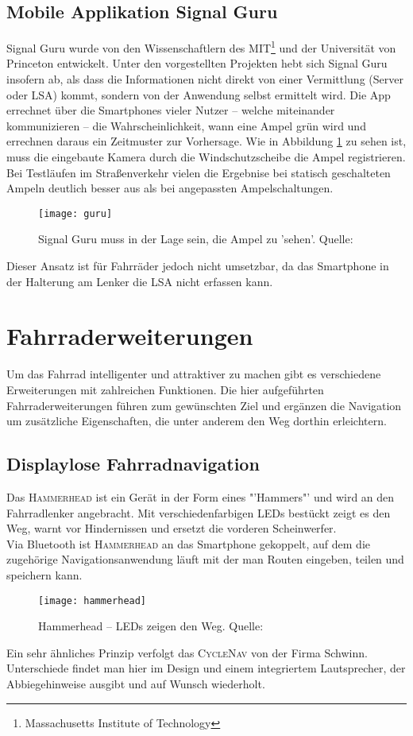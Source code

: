 \subsection*{Mobile Applikation Signal Guru}
Signal Guru wurde von den Wissenschaftlern des MIT\footnote{ Massachusetts Institute of Technology} und der Universität von Princeton entwickelt. Unter den vorgestellten Projekten hebt sich Signal Guru insofern ab, als dass die Informationen nicht direkt von einer Vermittlung (Server oder \gls{LSA}) kommt, sondern von der Anwendung selbst ermittelt wird. Die \Gls{App} errechnet über die \glspl{Smartphone} vieler Nutzer -- welche miteinander kommunizieren -- die Wahrscheinlichkeit, wann eine Ampel grün wird und errechnen daraus ein Zeitmuster zur Vorhersage. Wie in Abbildung \ref{fig:AppSignalGuru} zu sehen ist, muss die eingebaute Kamera durch die Windschutzscheibe die Ampel registrieren. Bei Testläufen im Straßenverkehr vielen die Ergebnise bei statisch geschalteten Ampeln deutlich besser aus als bei angepassten Ampelschaltungen. \cite{SignalGuruPaper}\\ 
\begin{figure}[H]
    \centering
    \texttt{[image: guru]}
    \grayRule
    \caption[Signal Guru]{Signal Guru muss in der Lage sein, die Ampel zu 'sehen'.  Quelle: \cite{SignalGuruPaper}} \label{fig:AppSignalGuru}
\end{figure}
Dieser Ansatz ist für Fahrräder jedoch nicht umsetzbar, da das \gls{Smartphone} in der Halterung am Lenker die \gls{LSA} nicht erfassen kann.
%
%
\clearpage
\section{Fahrraderweiterungen}
Um das Fahrrad intelligenter und attraktiver zu machen gibt es verschiedene Erweiterungen mit zahlreichen Funktionen. Die hier aufgeführten Fahrraderweiterungen führen zum gewünschten Ziel und ergänzen die Navigation um zusätzliche Eigenschaften, die unter anderem den Weg dorthin erleichtern.
\subsection{Displaylose Fahrradnavigation}
Das \textsc{Hammerhead} ist ein Gerät in der Form eines "'Hammers"' und wird an den Fahrradlenker angebracht. Mit verschiedenfarbigen \glspl{LED} bestückt zeigt es den Weg, warnt vor Hindernissen und ersetzt die vorderen Scheinwerfer.\\
Via Bluetooth ist \textsc{Hammerhead} an das \gls{Smartphone} gekoppelt, auf dem die zugehörige Navigationsanwendung läuft mit der man Routen eingeben, teilen und speichern kann. \cite{Hammerhead}\\
\begin{figure}[H]
    \centering
    \texttt{[image: hammerhead]}
    \grayRule
    \caption[Hammerhead]{Hammerhead -- \glspl{LED} zeigen den Weg.  Quelle: \cite{Hammerhead}} 
    \label{fig:hammerhead}
\end{figure}
Ein sehr ähnliches Prinzip verfolgt das \textsc{CycleNav} von der Firma Schwinn. Unterschiede findet man hier im Design und einem integriertem Lautsprecher, der Abbiegehinweise ausgibt und auf Wunsch wiederholt. \cite{CycleNav}
